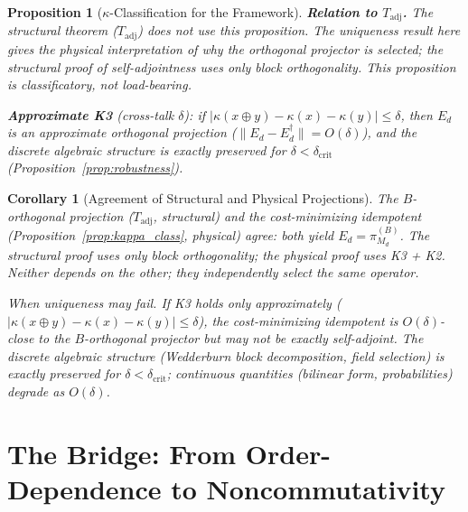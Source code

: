 \documentclass[11pt,a4paper]{article}
\newtheorem{proposition}[theorem]{Proposition}
\newtheorem{corollary}[theorem]{Corollary}
\theoremstyle{definition}
\begin{document}
\begin{proposition}[$\kappa$-Classification for the Framework]
\smallskip\noindent\textbf{Relation to $T_{\mathrm{adj}}$.}  The structural theorem ($T_{\mathrm{adj}}$) does not use this proposition.  The uniqueness result here gives the physical interpretation of why the orthogonal projector is selected; the structural proof of self-adjointness uses only block orthogonality.  This proposition is classificatory, not load-bearing.

\smallskip\noindent\textbf{Approximate K3} (cross-talk $\delta$): if $|\kappa(x \oplus y) - \kappa(x) - \kappa(y)| \le \delta$, then $E_d$ is an approximate orthogonal projection ($\|E_d - E_d^\dagger\| = O(\delta)$), and the discrete algebraic structure is exactly preserved for $\delta < \delta_{\mathrm{crit}}$ (Proposition~\ref{prop:robustness}).
\end{proposition}

\begin{corollary}[Agreement of Structural and Physical Projections]\label{cor:Tadj_agree}
The $B$-orthogonal projection ($T_{\mathrm{adj}}$, structural) and the cost-minimizing idempotent (Proposition~\ref{prop:kappa_class}, physical) agree: both yield $E_d = \pi_{M_d}^{(B)}$.  The structural proof uses only block orthogonality; the physical proof uses K3 + K2.  Neither depends on the other; they independently select the same operator.

\smallskip\noindent\textit{When uniqueness may fail.}  If K3 holds only approximately ($|\kappa(x \oplus y) - \kappa(x) - \kappa(y)| \le \delta$), the cost-minimizing idempotent is $O(\delta)$-close to the $B$-orthogonal projector but may not be exactly self-adjoint.  The discrete algebraic structure (Wedderburn block decomposition, field selection) is exactly preserved for $\delta < \delta_{\mathrm{crit}}$; continuous quantities (bilinear form, probabilities) degrade as $O(\delta)$.
\end{corollary}

\section{The Bridge: From Order-Dependence to Noncommutativity}
\label{sec:bridge}
\end{document}
